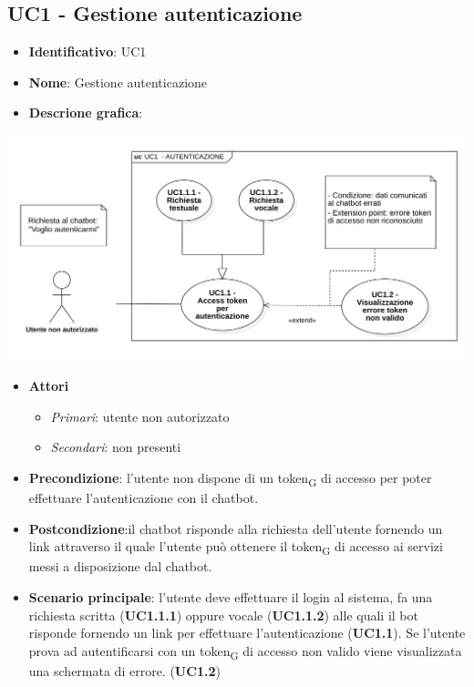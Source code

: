 \subsection{UC1 - Gestione autenticazione}
\begin{itemize}
    \item \textbf{Identificativo}: UC1
    \item \textbf{Nome}: Gestione autenticazione
    \item \textbf{Descrione grafica}:
\end{itemize}

\begin{center}
    \includegraphics[scale=0.50]{images/UC1.png} 
\end{center}

 \begin{itemize}
    \item \textbf{Attori}
 \begin{itemize} 
    \item \textit{Primari}: utente non autorizzato
    \item \textit{Secondari}: non presenti
 \end{itemize}
 \item \textbf{Precondizione}: l'utente non dispone di un token\textsubscript{G} di accesso per poter effettuare l'autenticazione con il chatbot.
 \item \textbf{Postcondizione}:il chatbot risponde alla richiesta dell'utente fornendo un link attraverso il quale l'utente può ottenere il token\textsubscript{G} di accesso ai servizi messi a disposizione dal chatbot.
 \item \textbf{Scenario principale}: l'utente deve effettuare il login al sistema, fa una richiesta scritta (\textbf{UC1.1.1}) oppure vocale (\textbf{UC1.1.2}) alle quali il bot risponde fornendo un link per effettuare l'autenticazione (\textbf{UC1.1}). Se l'utente prova ad autentificarsi con un token\textsubscript{G} di accesso non valido viene visualizzata una schermata di errore. (\textbf{UC1.2})
\end{itemize}
\newpage

